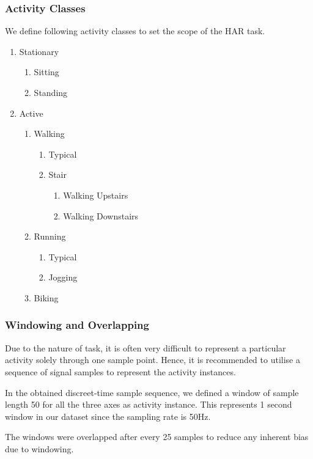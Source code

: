 \documentclass[
10pt, %
a4paper, %
oneside, %
headinclude,footinclude, %
BCOR5mm, %
]{scrartcl}
\begin{document}
\subsubsection{Activity Classes}
We define following activity classes to set the scope of the HAR task.
\begin{enumerate}
	\item Stationary
	\begin{enumerate}
		\item Sitting
		\item Standing
	\end{enumerate}
	\item Active
	\begin{enumerate}
		\item Walking
		\begin{enumerate}
			\item Typical
			\item Stair
			\begin{enumerate}
				\item Walking Upstairs
				\item Walking Downstairs
			\end{enumerate}
		\end{enumerate}
		\item Running
		\begin{enumerate}
			\item Typical
			\item Jogging
		\end{enumerate}
		\item Biking
	\end{enumerate}
\end{enumerate}

\subsubsection{Windowing and Overlapping}
Due to the nature of task, it is often very difficult to represent a particular activity solely through one sample point. Hence, it is recommended to utilise a sequence of signal samples to represent the activity instances.

In the obtained discreet-time sample sequence, we defined a window of sample length 50 for all the three axes as activity instance. This represents 1 second window in our dataset since the sampling rate is 50Hz.

The windows were overlapped after every 25 samples to reduce any inherent bias due to windowing.
\end{document}
